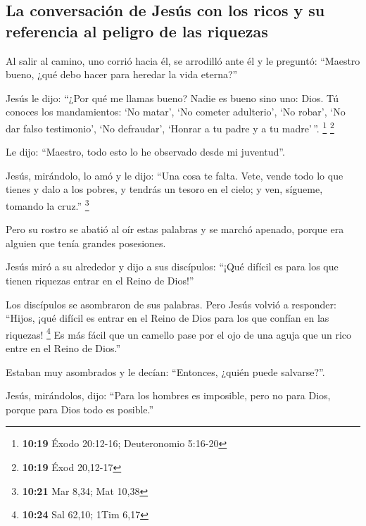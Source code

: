 \begin{paracol}{2}
\hypertarget{la-conversaciuxf3n-de-jesuxfas-con-los-ricos-y-su-referencia-al-peligro-de-las-riquezas}{%
\subsection{La conversación de Jesús con los ricos y su referencia al
peligro de las
riquezas}\label{la-conversaciuxf3n-de-jesuxfas-con-los-ricos-y-su-referencia-al-peligro-de-las-riquezas}}

 Al salir al camino, uno corrió hacia él, se arrodilló
ante él y le preguntó: ``Maestro bueno, ¿qué debo hacer para heredar la
vida eterna?''

 Jesús le dijo: ``¿Por qué me llamas bueno? Nadie es
bueno sino uno: Dios.  Tú conoces los mandamientos: `No
matar', `No cometer adulterio', `No robar', `No dar falso testimonio',
`No defraudar', `Honrar a tu padre y a tu madre'\,''. \footnote{\textbf{10:19}
  Éxodo 20:12-16; Deuteronomio 5:16-20} \footnote{\textbf{10:19} Éxod
  20,12-17}

 Le dijo: ``Maestro, todo esto lo he observado desde mi
juventud''.

 Jesús, mirándolo, lo amó y le dijo: ``Una cosa te falta.
Vete, vende todo lo que tienes y dalo a los pobres, y tendrás un tesoro
en el cielo; y ven, sígueme, tomando la cruz.'' \footnote{\textbf{10:21}
  Mar 8,34; Mat 10,38}

 Pero su rostro se abatió al oír estas palabras y se
marchó apenado, porque era alguien que tenía grandes posesiones.

 Jesús miró a su alrededor y dijo a sus discípulos:
``¡Qué difícil es para los que tienen riquezas entrar en el Reino de
Dios!''

 Los discípulos se asombraron de sus palabras. Pero Jesús
volvió a responder: ``Hijos, ¡qué difícil es entrar en el Reino de Dios
para los que confían en las riquezas! \footnote{\textbf{10:24} Sal
  62,10; 1Tim 6,17}  Es más fácil que un camello pase por
el ojo de una aguja que un rico entre en el Reino de Dios.''

 Estaban muy asombrados y le decían: ``Entonces, ¿quién
puede salvarse?''.

 Jesús, mirándolos, dijo: ``Para los hombres es
imposible, pero no para Dios, porque para Dios todo es posible.''

\hypertarget{la-recompensa-de-seguir-a-jesuxfas-y-la-renuncia}{%
}
\end{paracol}
